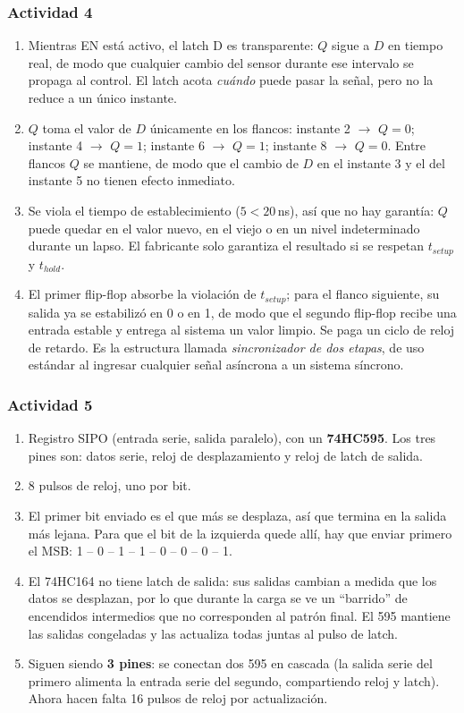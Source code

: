 \subsubsection*{Actividad 4}

\begin{enumerate}[label=\textbf{\alph*)}]
    \item Mientras EN está activo, el latch D es transparente: $Q$ sigue a $D$ en tiempo real, de modo que cualquier cambio del sensor durante ese intervalo se propaga al control. El latch acota \textit{cuándo} puede pasar la señal, pero no la reduce a un único instante.
    \item $Q$ toma el valor de $D$ únicamente en los flancos: instante 2 $\rightarrow$ $Q = 0$; instante 4 $\rightarrow$ $Q = 1$; instante 6 $\rightarrow$ $Q = 1$; instante 8 $\rightarrow$ $Q = 0$. Entre flancos $Q$ se mantiene, de modo que el cambio de $D$ en el instante 3 y el del instante 5 no tienen efecto inmediato.
    \item Se viola el tiempo de establecimiento ($5 < 20$\,ns), así que no hay garantía: $Q$ puede quedar en el valor nuevo, en el viejo o en un nivel indeterminado durante un lapso. El fabricante solo garantiza el resultado si se respetan $t_{setup}$ y $t_{hold}$.
    \item El primer flip-flop absorbe la violación de $t_{setup}$; para el flanco siguiente, su salida ya se estabilizó en 0 o en 1, de modo que el segundo flip-flop recibe una entrada estable y entrega al sistema un valor limpio. Se paga un ciclo de reloj de retardo. Es la estructura llamada \textit{sincronizador de dos etapas}, de uso estándar al ingresar cualquier señal asíncrona a un sistema síncrono.
\end{enumerate}

\subsubsection*{Actividad 5}

\begin{enumerate}[label=\textbf{\alph*)}]
    \item Registro SIPO (entrada serie, salida paralelo), con un \textbf{74HC595}. Los tres pines son: datos serie, reloj de desplazamiento y reloj de latch de salida.
    \item 8 pulsos de reloj, uno por bit.
    \item El primer bit enviado es el que más se desplaza, así que termina en la salida más lejana. Para que el bit de la izquierda quede allí, hay que enviar primero el MSB: 1 -- 0 -- 1 -- 1 -- 0 -- 0 -- 0 -- 1.
    \item El 74HC164 no tiene latch de salida: sus salidas cambian a medida que los datos se desplazan, por lo que durante la carga se ve un ``barrido'' de encendidos intermedios que no corresponden al patrón final. El 595 mantiene las salidas congeladas y las actualiza todas juntas al pulso de latch.
    \item Siguen siendo \textbf{3 pines}: se conectan dos 595 en cascada (la salida serie del primero alimenta la entrada serie del segundo, compartiendo reloj y latch). Ahora hacen falta 16 pulsos de reloj por actualización.
\end{enumerate}

